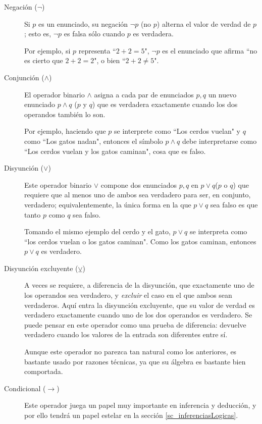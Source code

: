 \documentclass{book}
\theoremstyle{definition}
\begin{document}
\begin{description}
	\item [Negación ($\neg$)]  %
	Si $p$ es un enunciado, su negación $\neg p$ (no $p$) alterna el valor de verdad de $p$; esto es, $\neg p$ es falsa sólo cuando $p$ es verdadera.
	
	Por ejemplo, si $p$ representa ``$2+2=5$", $\neg p$ es el enunciado que afirma ``no es cierto que $2+2=2$", o bien ``$2+2\neq 5$".

	\item[Conjunción ($\wedge$)] El operador binario $\wedge$ asigna a cada par de enunciados $p,q$ un nuevo enunciado $p \wedge q$ ($p$ y $q$) que es verdadera exactamente cuando los dos operandos también lo son.

	Por ejemplo, haciendo que $p$ se interprete como ``Los cerdos vuelan" y $q$ como ``Los gatos nadan", entonces el símbolo $p\wedge q$ debe interpretarse como ``Los cerdos vuelan y los gatos caminan", cosa que es falso.
	
	\item[Disyunción ($\vee$)] Este operador binario $\vee$ compone dos enunciados $p,q$ en $p\vee q$($p$ o $q$) que requiere que al menos uno de ambos sea verdadero para ser, en conjunto, verdadero; equivalentemente, la única forma en la que $p \vee q$ sea falso es que tanto $p$ como $q$ sea falso.
	
	Tomando el mismo ejemplo del cerdo y el gato, $p\vee q$ se interpreta como ``los cerdos vuelan o los gatos caminan".
	Como los gatos caminan, entonces $p \vee q$ es verdadero.
	
	\item[Disyunción excluyente ($\veebar$)] A veces se requiere, a diferencia de la disyunción, que exactamente uno de los operandos sea verdadero, y \emph{excluir} el caso en el que ambos sean verdaderos.
	Aquí entra la disyunción excluyente, que su valor de verdad es verdadero exactamente cuando uno de los dos operandos es verdadero.
	Se puede pensar en este operador como una prueba de diferencia: devuelve verdadero cuando los valores de la entrada son diferentes entre sí.
	
	Aunque este operador no parezca tan natural como los anteriores, es bastante usado por razones técnicas, ya que su álgebra es bastante bien comportada. %
	
	\item[Condicional ($\rightarrow$)] Este operador juega un papel muy importante en inferencia y deducción, y por ello tendrá un papel estelar en la sección \ref{sc_inferenciasLogicas}.
	

\end{description}
\end{document}
